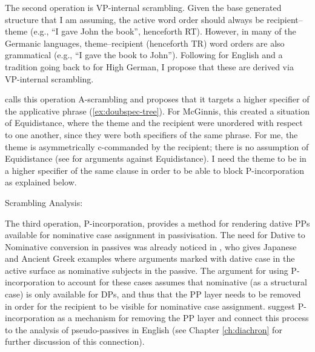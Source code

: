 The second operation is VP-internal scrambling. Given the base generated structure that I am assuming, the active word order should always be recipient--theme (e.g., ``I gave John the book'', henceforth RT). However, in many of the Germanic languages, theme--recipient (henceforth TR) word orders are also grammatical (e.g., ``I gave the book to John''). Following \cite{Takano.1998} for English and a tradition going back to \cite{Lenerz.1977} for High German, I propose that these are derived via VP-internal scrambling.

\cite{McGinnis.1998} calls this operation A-scrambling and proposes that it targets a higher specifier of the applicative phrase (\ref{ex:doubspec-tree}). For McGinnis, this created a situation of Equidistance, where the theme and the recipient were unordered with respect to one another, since they were both specifiers of the same phrase. For me, the theme is asymmetrically c-commanded by the recipient; there is no assumption of Equidistance (see \citealt{doggett.2004} for arguments against Equidistance). I need the theme to be in a higher specifier of the same clause in order to be able to block P-incorporation as explained below. 

\begin{exe}
	\ex Scrambling Analysis:\label{ex:doubspec-tree}
 \end{exe} 

 The third operation, P-incorporation, provides a method for rendering dative PPs available for nominative case assignment in passivisation. The need for Dative to Nominative conversion in passives was already noticed in \cite{Larson.1988}, who gives Japanese and Ancient Greek examples where arguments marked with dative case in the active surface as nominative subjects in the passive. The argument for using P-incorporation to account for these cases assumes that nominative (as a structural case) is only available for DPs, and thus that the PP layer needs to be removed in order for the recipient to be visible for nominative case assignment. \cite{Alexiadou.2014} suggest P-incorporation as a mechanism for removing the PP layer and connect this process to the analysis of pseudo-passives in English (see Chapter \ref{ch:diachron} for further discussion of this connection). 


